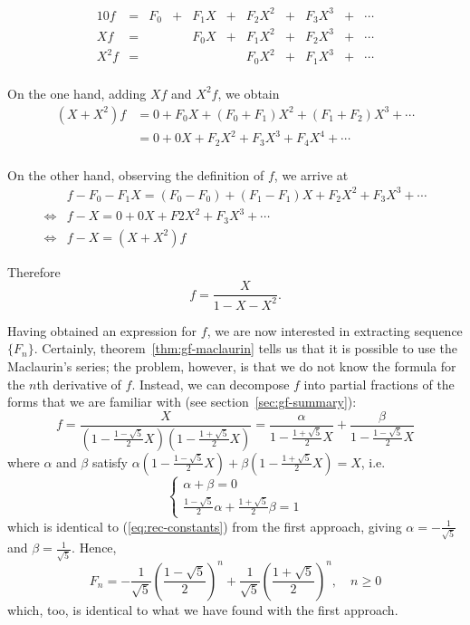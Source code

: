 \documentclass[a4paper, 12pt]{report}
\begin{document}
\begin{alignat*}{10}
f &= &F_0 &+ &F_1 X &+ &F_2 X^2 &+ &F_3 X^3 &+ &\cdots\\
X f &= & & &F_0 X &+ &F_1 X^2 &+ &F_2 X^3 &+ &\cdots\\
X^2 f &= & & & & &F_0 X^2 &+ &F_1 X^3 &+ &\cdots\\
\end{alignat*}

On the one hand, adding $X f$ and $X^2 f$, we obtain
\begin{align*}
    (X + X^2) f 
    &= 0 + F_0 X + (F_0 + F_1) X^2 + (F_1 + F_2) X^3 + \cdots\\
    &= 0 + 0 X + F_2 X^2 + F_3 X^3 + F_4 X^4 + \cdots\\
\end{align*}

On the other hand, observing the definition of $f$, we arrive at
\begin{align*}
    &f - F_0 - F_1 X = (F_0 - F_0) + (F_1 - F_1)X + F_2 X^2 + F_3 X^3 + \cdots\\
    \iff &f - X = 0 + 0X + F2 X^2 + F_3 X^3 + \cdots\\
    \iff &f - X = (X + X^2) f
\end{align*}

Therefore \[f = \frac{X}{1 - X - X^2}.\]

Having obtained an expression for $f$, we are now interested in extracting sequence $\{F_n\}$. Certainly, theorem~\ref{thm:gf-maclaurin} tells us that it is possible to use the Maclaurin's series; the problem, however, is that we do not know the formula for the $n$th derivative of $f$. Instead, we can decompose $f$ into partial fractions of the forms that we are familiar with (see section~\ref{sec:gf-summary}):
\[
    f
    = \frac{X}{
     (1 - \frac{1 - \sqrt{5}}{2} X)
     (1 - \frac{1 + \sqrt{5}}{2} X)
    }
    = \frac{\alpha}{1 - \frac{1 + \sqrt{5}}{2} X} + \frac{\beta}{1 - \frac{1 - \sqrt{5}}{2} X}
\]
where $\alpha$ and $\beta$ satisfy $\alpha(1 - \frac{1 - \sqrt{5}}{2}X) + \beta(1 - \frac{1 + \sqrt{5}}{2}X) = X$, i.e.
\[
\begin{cases}
\alpha + \beta = 0\\
\frac{1 - \sqrt{5}}{2} \alpha + \frac{1 + \sqrt{5}}{2} \beta = 1
\end{cases}
\]
which is identical to (\ref{eq:rec-constants}) from the first approach, giving $\alpha = -\frac{1}{\sqrt{5}}$ and $\beta = \frac{1}{\sqrt{5}}$. Hence, 
\[
F_n = -\frac{1}{\sqrt{5}} \left(\frac{1 - \sqrt{5}}{2}\right)^n + \frac{1}{\sqrt{5}} \left(\frac{1 + \sqrt{5}}{2}\right)^n, \quad n \geq 0
\]
which, too, is identical to what we have found with the first approach. 
\end{document}

